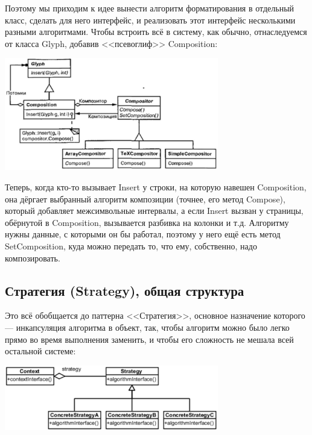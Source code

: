 \documentclass{../mcstext}
\begin{document}
Поэтому мы приходим к идее вынести алгоритм форматирования в отдельный класс, сделать для него интерфейс, и реализовать этот интерфейс несколькими разными алгоритмами. Чтобы встроить всё в систему, как обычно, отнаследуемся от класса Glyph, добавив <<псевоглиф>> Composition:

\begin{center}
    \includegraphics[width=0.7\textwidth]{compositor.png}
\end{center}

Теперь, когда кто-то вызывает Insert у строки, на которую навешен Composition, она дёргает выбранный алгоритм композиции (точнее, его метод Compose), который добавляет межсимвольные интервалы, а если Insert вызван у страницы, обёрнутой в Composition, вызывается разбивка на колонки и т.д. Алгоритму нужны данные, с которыми он бы работал, поэтому у него ещё есть метод SetComposition, куда можно передать то, что ему, собственно, надо композировать.

\subsection{Стратегия (Strategy), общая структура}

Это всё обобщается до паттерна <<Стратегия>>, основное назначение которого --- инкапсуляция алгоритма в объект, так, чтобы алгоритм можно было легко прямо во время выполнения заменить, и чтобы его сложность не мешала всей остальной системе:

\begin{center}
    \includegraphics[width=0.7\textwidth]{strategy.png}
\end{center}
\end{document}
